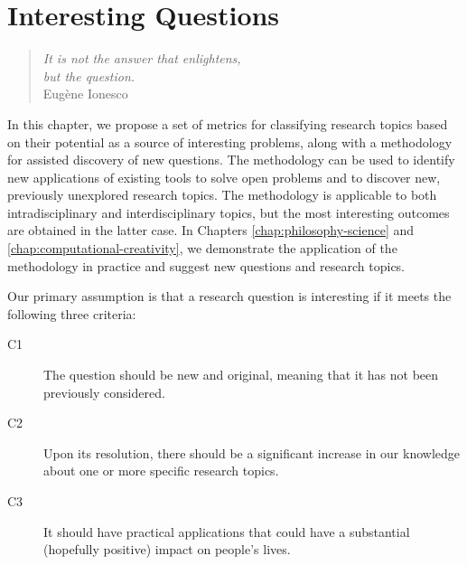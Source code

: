 %
%

%
%


\chapter{Interesting Questions}
\label{chap:Interesting-Research-Questions}

\begin{quote}
\begin{flushright}
\emph{It is not the answer that enlightens,\\
but the question. \\}
Eugène Ionesco
\end{flushright}
\end{quote}
\bigskip

In this chapter, we propose a set of metrics for classifying research topics based on their potential as a source of interesting problems, along with a methodology for assisted discovery of new questions. The methodology can be used to identify new applications of existing tools to solve open problems and to discover new, previously unexplored research topics. The methodology is applicable to both intradisciplinary and interdisciplinary topics, but the most interesting outcomes are obtained in the latter case. In Chapters \ref{chap:philosophy-science} and \ref{chap:computational-creativity}, we demonstrate the application of the methodology in practice and suggest new questions and research topics.

Our primary assumption is that a research question is interesting if it meets the following three criteria:

\bigskip

\begin{description}
\item[C1] The question should be new and original, meaning that it has not been previously considered.
\item[C2] Upon its resolution, there should be a significant increase in our knowledge about one or more specific research topics.
\item[C3] It should have practical applications that could have a substantial (hopefully positive) impact on people's lives.
\end{description}

